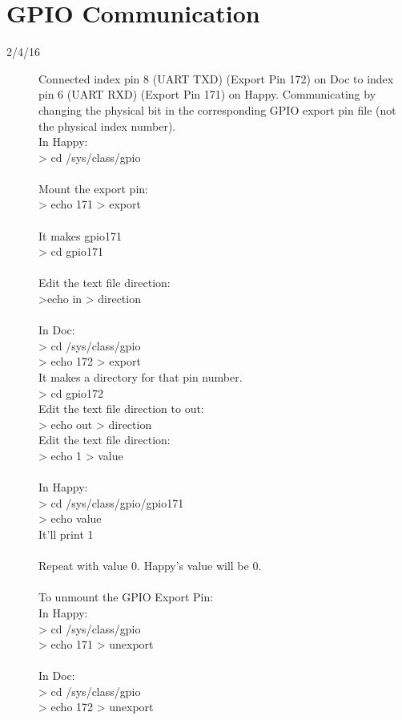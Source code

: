 \section{GPIO Communication}
\begin{description}
\item [2/4/16]  Connected index pin 8 (UART TXD) (Export Pin 172) on Doc to index pin 6 (UART RXD) (Export Pin 171) on Happy. Communicating by changing the physical bit in the corresponding GPIO export pin file (not the physical index number).  \\

In Happy: \\
> cd /sys/class/gpio \\ \\
Mount the export pin: \\
> echo 171 > export \\ \\
It makes gpio171\\
> cd gpio171 \\ \\
Edit the text file direction:\\
>echo in > direction \\ \\
In Doc: \\
> cd /sys/class/gpio \\
> echo 172 > export \\
It makes a directory for that pin number. \\
> cd gpio172 \\
Edit the text file direction to out: \\
> echo out > direction \\
Edit the text file direction: \\
> echo 1 > value \\ \\
In Happy: \\
> cd /sys/class/gpio/gpio171 \\
> echo value \\
It'll print 1 \\ \\
Repeat with value 0. Happy's value will be 0. \\ \\
To unmount the GPIO Export Pin: \\
In Happy: \\
> cd /sys/class/gpio \\
> echo 171 > unexport \\ \\
In Doc: \\
> cd /sys/class/gpio \\
> echo 172 > unexport


\end{description}

